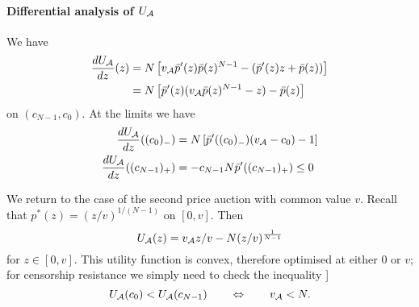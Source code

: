 \paragraph{Differential analysis of $U_{\mathcal{A}}$}
We have
\begin{align*}
  \frac{dU_{\mathcal{A}}}{dz}(z) &= N\left[ v_{\mathcal{A}}\bar{p}'(z)\bar{p}(z)^{N-1} - (\bar{p}'(z)z + \bar{p}(z) ) \right] \\
  &= N\left[ \bar{p}'(z)(v_{\mathcal{A}}\bar{p}(z)^{N-1} - z) - \bar{p}(z) \right]
\end{align*}
on $(c_{N-1},c_0)$.
%
At the limits we have
\begin{align*}
    \frac{dU_{\mathcal{A}}}{dz}((c_0)_-) &= N\left[ \bar{p}'((c_0)_-)(v_{\mathcal{A}}-c_0) - 1 \right] \\
    \frac{dU_{\mathcal{A}}}{dz}((c_{N-1})_+) &= -c_{N-1}N\bar{p}'((c_{N-1})_+) \leq 0
\end{align*}

\begin{example}

  We return to the case of the second price auction with common value $v$.
  Recall that $p^*(z)=(z/v)^{1/(N-1)}$ on $[0,v]$.
  Then 
  \[
    U_{\mathcal{A}}(z) = v_{\mathcal{A}} z/v - N(z/v)^{\frac{1}{N-1}}
  \]
  for $z\in[0,v]$.
  This utility function is convex, therefore optimised at either $0$ or $v$; for censorship resistance we simply need to check the inequality ]
  \[
    U_{\mathcal{A}}(c_0) < U_{\mathcal{A}}(c_{N-1}) \qquad \Leftrightarrow \qquad v_{\mathcal{A}} < N.
  \]
\end{example}
